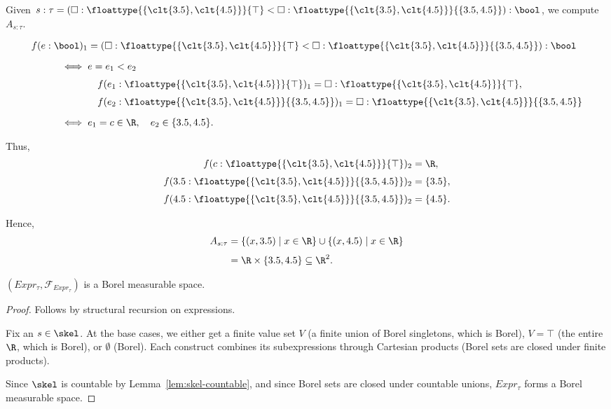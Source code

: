 \begin{example}
	Given $s : \tau = (\square : \floattype{\{\clt{3.5}, \clt{4.5}\}}{\top} < \square : \floattype{\{\clt{3.5}, \clt{4.5}\}}{\{3.5,4.5\}}) : \bool$, we compute $A_{s : \tau}$.

	\begin{align*}
		f(e : \bool)_1 
			&= (\square : \floattype{\{\clt{3.5}, \clt{4.5}\}}{\top} 
				< \square : \floattype{\{\clt{3.5}, \clt{4.5}\}}{\{3.5,4.5\}}) : \bool \\[6pt]
		\iff\;& 
			e = e_1 < e_2 \\[3pt]
		&\quad 
			f(e_1 : \floattype{\{\clt{3.5}, \clt{4.5}\}}{\top})_1 
			= \square : \floattype{\{\clt{3.5}, \clt{4.5}\}}{\top}, \\[3pt]
		&\quad 
			f(e_2 : \floattype{\{\clt{3.5}, \clt{4.5}\}}{\{3.5,4.5\}})_1 
				= \square : \floattype{\{\clt{3.5}, \clt{4.5}\}}{\{3.5,4.5\}} \\[6pt]
		\iff\;& 
			e_1 = c \in \R, \quad e_2 \in \{3.5, 4.5\}.
	\end{align*}
	
	Thus,
	\begin{align*}
		f(c : \floattype{\{\clt{3.5}, \clt{4.5}\}}{\top})_2 &= \R, \\[3pt]
		f(3.5 : \floattype{\{\clt{3.5}, \clt{4.5}\}}{\{3.5,4.5\}})_2 &= \{3.5\}, \\[3pt]
		f(4.5 : \floattype{\{\clt{3.5}, \clt{4.5}\}}{\{3.5,4.5\}})_2 &= \{4.5\}.
	\end{align*}
	
	Hence,
	\begin{align*}
		A_{s : \tau} 
			&= \{(x, 3.5) \mid x \in \R\} \cup \{(x, 4.5) \mid x \in \R\} \\[3pt]
			&= \R \times \{3.5, 4.5\} \subseteq \R^2.
	\end{align*}	
\end{example}

\begin{lemma}
	$(Expr_{\tau}, \mathcal{F}_{Expr_{\tau}})$ is a Borel measurable space.
\end{lemma}

\begin{proof}
	Follows by structural recursion on expressions. 
	
	Fix an $s \in \skel$. At the base cases, we either get a finite value set $V$ (a finite union of Borel singletons, which is Borel), $V = \top$ (the entire $\R$, which is Borel), or $\emptyset$ (Borel). Each construct combines its subexpressions through Cartesian products (Borel sets are closed under finite products).

	Since $\skel$ is countable by Lemma~\ref{lem:skel-countable}, and since Borel sets are closed under countable unions, $Expr_{\tau}$ forms a Borel measurable space.
\end{proof}


